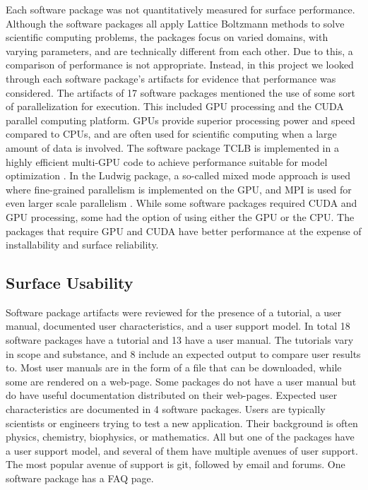 \documentclass[12pt, notitlepage]{article}
\begin{document}
Each software package was not quantitatively measured for surface performance.
Although the software packages all apply Lattice Boltzmann methods to solve scientific computing problems, the packages focus on varied domains, with varying parameters, and are technically different from each other. Due to this, a comparison of performance is not appropriate. Instead, in this project we looked through each software package's artifacts for evidence that performance was considered. The artifacts of 17 software packages mentioned the use of some sort of parallelization for execution. This included GPU processing and the CUDA parallel computing platform. GPUs provide superior processing power and speed compared to CPUs, and are often used for scientific computing when a large amount of data is involved. The software package TCLB is implemented in a highly efficient multi-GPU code to achieve performance suitable for model optimization \citep{rutkowski2020open}. In the Ludwig package, a so-called mixed mode approach is used where fine-grained parallelism is implemented on the GPU, and MPI is used for even larger scale parallelism \citep{gray2013ludwig}. While some software packages required CUDA and GPU processing, some had the option of using either the GPU or the CPU. The packages that require GPU and CUDA have better performance at the expense of installability and surface reliability.

\subsection{Surface Usability}

Software package artifacts were reviewed for the presence of a tutorial, a user manual, documented user characteristics, and a user support model. In total 18 software packages have a tutorial and 13 have a user manual. The tutorials vary in scope and substance, and 8 include an expected output to compare user results to. Most user manuals are in the form of a file that can be downloaded, while some are rendered on a web-page. Some packages do not have a user manual but do have useful documentation distributed on their web-pages. Expected user characteristics are documented in 4 software packages. Users are typically scientists or engineers trying to test a new application. Their background is often physics, chemistry, biophysics, or mathematics. All but one of the packages have a user support model, and several of them have multiple avenues of user support. The most popular avenue of support is git, followed by email and forums. One software package has a FAQ page.    
\end{document}
